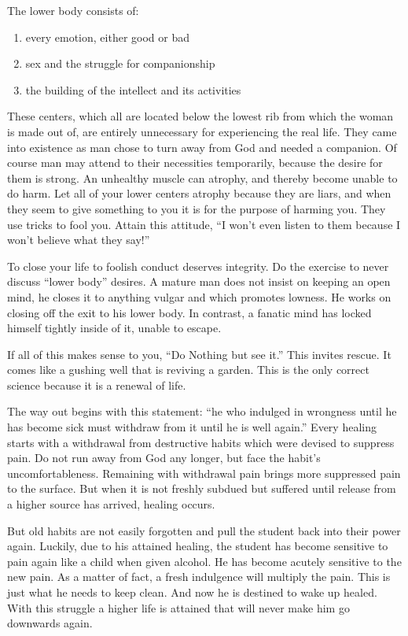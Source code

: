\documentclass[landscape,twocolumn,letterpaper]{article}
\begin{document}
The lower body consists of:
\begin{enumerate}
\item every emotion, either good or bad
\item sex and the struggle for companionship
\item the building of the intellect and its activities
\end{enumerate} These centers, which all are located below the lowest
rib from which the woman is made out of, are entirely unnecessary for
experiencing the real life. They came into existence as man chose to
turn away from God and needed a companion. Of course man may attend to
their necessities temporarily, because the desire for them is
strong. An unhealthy muscle can atrophy, and thereby become unable to
do harm. Let all of your lower centers atrophy because they are liars,
and when they seem to give something to you it is for the purpose of
harming you. They use tricks to fool you. Attain this attitude, ``I
won't even listen to them because I won't believe what they say!''

To close your life to foolish conduct deserves integrity. Do the
exercise to never discuss ``lower body'' desires. A mature man does
not insist on keeping an open mind, he closes it to anything vulgar
and which promotes lowness. He works on closing off the exit to his
lower body. In contrast, a fanatic mind has locked himself tightly
inside of it, unable to escape.

If all of this makes sense to you, ``Do Nothing but see it.'' This
invites rescue. It comes like a gushing well that is reviving a
garden. This is the only correct science because it is a renewal of
life.

The way out begins with this statement: ``he who indulged in wrongness
until he has become sick must withdraw from it until he is well
again.'' Every healing starts with a withdrawal from destructive
habits which were devised to suppress pain. Do not run away from God
any longer, but face the habit's uncomfortableness. Remaining with
withdrawal pain brings more suppressed pain to the surface. But when
it is not freshly subdued but suffered until release from a higher
source has arrived, healing occurs.

But old habits are not easily forgotten and pull the student back into
their power again. Luckily, due to his attained healing, the student
has become sensitive to pain again like a child when given alcohol. He
has become acutely sensitive to the new pain. As a matter of fact, a
fresh indulgence will multiply the pain. This is just what he needs to
keep clean. And now he is destined to wake up healed. With this
struggle a higher life is attained that will never make him go
downwards again.
\end{document}
